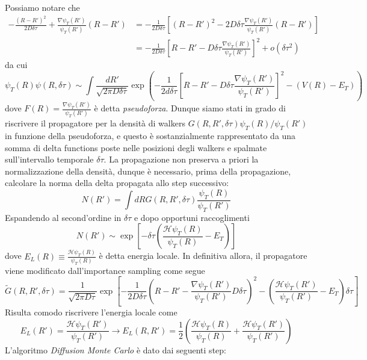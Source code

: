 \documentclass[11pt,a4paper]{article}
\begin{document}
Possiamo notare che
\[
\begin{split}
-\frac{(R-R')^2}{2D\delta \tau} + \frac{\nabla \psi_T(R')}{\psi_T(R')}(R-R') &= -\frac{1}{2D\delta \tau} \left[ (R-R')^2 - 2D\delta \tau \frac{\nabla \psi_T(R')}{\psi_T(R')}(R-R')\right] \\
&= -\frac{1}{2D\delta \tau} \left[ R-R' - D\delta \tau \frac{\nabla \psi_T(R')}{\psi_T(R')}\right]^2 + o(\delta \tau^2)
\end{split}
\]
da cui
\[
\psi_T(R)\psi(R,\delta\tau) \sim \int \frac{dR'}{\sqrt{2\pi D \delta \tau}} \exp\left(-\frac{1}{2d\delta \tau}\left[ R-R' - D\delta \tau \frac{\nabla \psi_T(R')}{\psi_T(R')} \right]^2 - (V(R)-E_T) \right)
\]
dove $F(R) = \frac{\nabla \psi_T(R')}{\psi_T(R')} $ è detta \emph{pseudoforza}. Dunque siamo stati in grado di riscrivere il propagatore per la densità di walkers $G(R,R',\delta \tau)\psi_T(R)/\psi_T(R')$ in funzione della pseudoforza, e questo è sostanzialmente rappresentato da una somma di delta functions poste nelle posizioni degli walkers e spalmate sull'intervallo temporale $\delta \tau$. La propagazione non preserva a priori la normalizzazione della densità, dunque è necessario, prima della propagazione, calcolare la norma della delta propagata allo step successivo:
\begin{equation}
N(R') = 	\int dR G(R,R',\delta \tau) \frac{\psi_T(R)}{\psi_T(R')}
\end{equation}
Espandendo al second'ordine in $\delta \tau$ e dopo opportuni raccoglimenti
\begin{equation}
N(R') \sim \exp\left[ -\delta \tau \left( \frac{\mathcal{H}\psi_T(R)}{\psi_T(R)} -E_T\right) \right]
\end{equation}
dove $E_L(R) \equiv \frac{\mathcal{H}\psi_T(R)}{\psi_T(R)}$ è detta energia locale. In definitiva allora, il propagatore viene modificato dall'importance sampling come segue
\[
\tilde{G}(R,R',\delta \tau) = \frac{1}{\sqrt{2\pi D \tau}} \exp \left[ -\frac{1}{2D \delta \tau} \left( R-R'- \frac{\nabla \psi_T(R')}{\psi_T(R')} D \delta \tau\right)^2 - \left( \frac{\mathcal{H}\psi_T(R')}{\psi_T(R')} - E_T \right)\delta\tau \right]
\]
Risulta comodo riscrivere l'energia locale come
\[
E_L(R') = \frac{\mathcal{H}\psi_T(R')}{\psi_T(R')} \longrightarrow E_L(R,R') = \frac{1}{2}\left(\frac{\mathcal{H}\psi_T(R)}{\psi_T(R)}  + \frac{\mathcal{H}\psi_T(R')}{\psi_T(R')} \right)
\]
L'algoritmo \emph{Diffusion Monte Carlo} è dato dai seguenti step:
\end{document}
